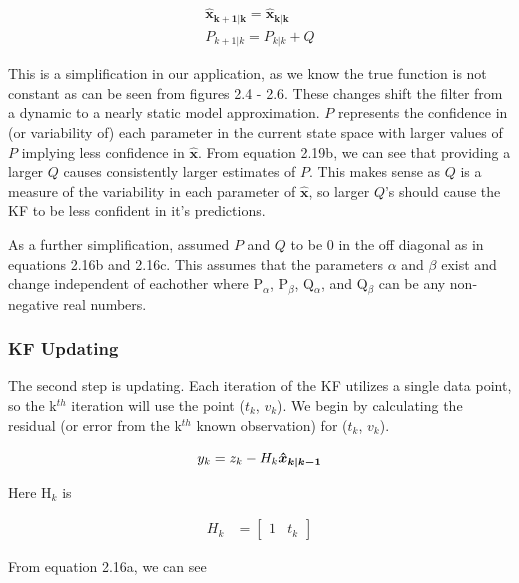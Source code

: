   \begin{subequations}
  \begin{align}
  \bm{\hat{x}_{k+1|k}} = \bm{\hat{x}_{k|k}}  \\
  P_{k+1|k} = P_{k|k}+Q
  \end{align}
  \end{subequations}
  
  This is a simplification in our application, as we know the true function is not constant as can be seen from figures 2.4 - 2.6. These changes shift the filter from a dynamic to a nearly static model approximation. $P$ represents the confidence in (or variability of) each parameter in the current state space with larger values of $P$ implying less confidence in $\bm{\hat{x}}$. From equation 2.19b, we can see that providing a larger $Q$ causes consistently larger estimates of $P$. This makes sense as $Q$ is a measure of the variability in each parameter of $\bm{\hat{x}}$, so larger $Q$'s should cause the KF to be less confident in it's predictions.
  
  As a further simplification, assumed $P$ and $Q$ to be 0 in the off diagonal as in equations 2.16b and 2.16c. This assumes that the parameters $\alpha$ and $\beta$ exist and change independent of eachother where  P$_{\alpha}$,  P$_{\beta}$, Q$_{\alpha}$, and Q$_{\beta}$ can be any non-negative real numbers.
 
 \subsubsection{KF Updating}
 
  The second step is updating. Each iteration of the KF utilizes a single data point, so the k$^{th}$ iteration will use the point ($t_{k}$, $v_{k}$). We begin by calculating the residual (or error from the k$^{th}$ known observation) for ($t_{k}$, $v_{k}$).
  
  \begin{equation}
  \centering
  y_{k} = z_{k} - H_{k}\bm{\hat{x}_{k|k-1}}
  \end{equation}
  
  Here H$_{k}$ is
  
  \begin{align}
    H_{k} &= \begin{bmatrix}
           1&t_{k}
         \end{bmatrix}
  \end{align}
  
  From equation 2.16a, we can see 
  
